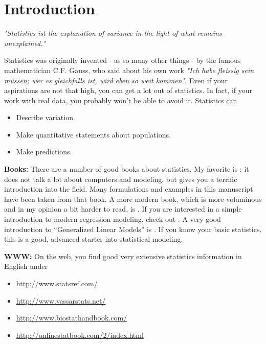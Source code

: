 \chapter{Introduction}

\emph{"Statistics ist the explanation of variance in the light of what remains
unexplained."}

\vspace{5 mm}

Statistics was originally invented - as so many other things - by the famous mathematician C.F. Gauss, who said about his own work \emph{"Ich habe fleissig sein m\"ussen; wer es gleichfalls ist, wird eben so weit kommen"}. Even if your aspirations are not that high, you can get a lot out of statistics. In fact, if your work with real data, you probably won't be able to avoid it. Statistics can

\begin{itemize}
  \item Describe variation.
  \item Make quantitative statements about populations.
  \item Make predictions.
\end{itemize}

\textbf{Books: }There are a number of good books about statistics. My favorite is \cite{altman99}: it does not talk a lot about computers and modeling, but gives you a terrific introduction into the field. Many formulations and examples in this manuscript have been taken from that book. A more modern book, which is more voluminous and in my opinion a bit harder to read, is \cite{Riffenburgh2012}. If you are interested in a simple introduction to modern regression modeling, check out \cite{Kaplan2009}. A very good introduction to “Generalized Linear Models” is \cite{Dobson2008}. If you know your basic statistics, this is a good, advanced starter into statistical modeling.

\vspace{5 mm}

\textbf{WWW: }On the web, you find good very extensive statistics information in English under
\begin{itemize}
    \item \url{http://www.statsref.com/}
    \item \url{http://www.vassarstats.net/}
    \item \url{http://www.biostathandbook.com/}
    \item \url{http://onlinestatbook.com/2/index.html}
\end{itemize}

